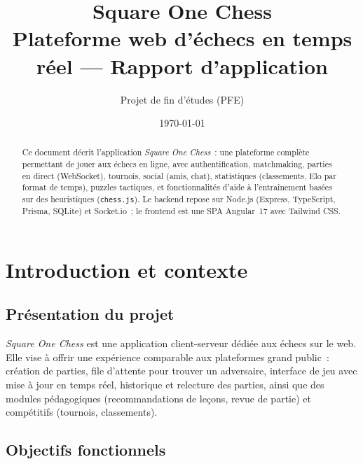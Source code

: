 \documentclass[11pt,a4paper]{report}
\title{\textbf{Square One Chess}\\[0.4em]
\large Plateforme web d'échecs en temps réel — Rapport d'application}
\author{Projet de fin d'études (PFE)}
\date{\today}
\begin{document}
\maketitle

\begin{abstract}
Ce document décrit l'application \emph{Square One Chess}~: une plateforme complète permettant de jouer aux échecs en ligne, avec authentification, matchmaking, parties en direct (WebSocket), tournois, social (amis, chat), statistiques (classements, Elo par format de temps), puzzles tactiques, et fonctionnalités d'aide à l'entraînement basées sur des heuristiques (\texttt{chess.js}). Le backend repose sur Node.js (Express, TypeScript, Prisma, SQLite) et Socket.io~; le frontend est une SPA Angular~17 avec Tailwind CSS.
\end{abstract}

\tableofcontents
\newpage

\chapter{Introduction et contexte}

\section{Présentation du projet}

\textit{Square One Chess} est une application client-serveur dédiée aux échecs sur le web. Elle vise à offrir une expérience comparable aux plateformes grand public~: création de parties, file d'attente pour trouver un adversaire, interface de jeu avec mise à jour en temps réel, historique et relecture des parties, ainsi que des modules pédagogiques (recommandations de leçons, revue de partie) et compétitifs (tournois, classements).

\section{Objectifs fonctionnels}
\end{document}
